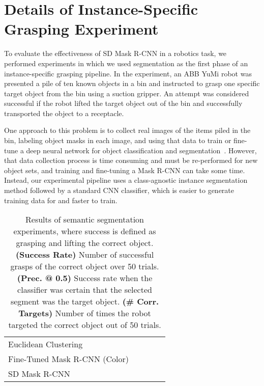 \documentclass[letterpaper, 10 pt, conference]{ieeeconf}  \pdfoutput=1
\numberwithin{equation}{section}
\begin{document}
\section{Details of Instance-Specific Grasping Experiment}
To evaluate the effectiveness of SD Mask R-CNN in a robotics task, we performed experiments in which we used segmentation as the first phase of an instance-specific grasping pipeline.
In the experiment, an ABB YuMi robot was presented a pile of ten known objects in a bin and instructed to grasp one specific target object from the bin using a suction gripper.
An attempt was considered successful if the robot lifted the target object out of the bin and successfully transported the object to a receptacle.

One approach to this problem is to collect real images of the items piled in the bin, labeling object masks in each image, and using that data to train or fine-tune a deep neural network for object classification and segmentation~\cite{morrison2017cartman, schwarz2017nimbro}.
However, that data collection process is time consuming and must be re-performed for new object sets, and training and fine-tuning a Mask R-CNN can take some time.
Instead, our experimental pipeline uses a class-agnostic instance segmentation method followed by a standard CNN classifier, which is easier to generate training data for and faster to train.

\begin{table*}[ht!]
    \setlength\tabcolsep{4pt}
    \begin{tabularx}{\linewidth}{*{1}{l}*{4}{Z}}
        \toprule
          &   &  &  \\\midrule
        Euclidean Clustering    &  &  &  \\
        Fine-Tuned Mask R-CNN (Color)  &  &  &  \\
        SD Mask R-CNN              &  &  & \\  
        \bottomrule
    \end{tabularx}
    \caption{Results of semantic segmentation experiments, where success is defined as grasping and lifting the correct object. \textbf{(Success Rate)} Number of successful grasps of the correct object over 50 trials.  \textbf{(Prec. @ 0.5)} Success rate when the classifier was  certain that the selected segment was the target object. \textbf{(\# Corr. Targets)} Number of times the robot targeted the correct object out of 50 trials.}
    \label{tab:phys_results}
\end{table*}
\end{document}

